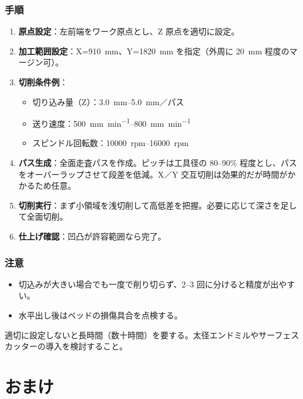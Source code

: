\documentclass[uplatex,dvipdfmx]{ujarticle}
\begin{document}
\subsubsection*{手順}
\begin{enumerate}
  \item \textbf{原点設定}：左前端をワーク原点とし、Z 原点を適切に設定。
  \item \textbf{加工範囲設定}：X=\SI{910}{\milli\meter}、Y=\SI{1820}{\milli\meter} を指定（外周に \SI{20}{\milli\meter} 程度のマージン可）。
  \item \textbf{切削条件例}：
  \begin{itemize}
    \item 切り込み量（Z）：\SIrange{3.0}{5.0}{\milli\meter}／パス
    \item 送り速度：\SIrange{500}{800}{\milli\meter\per\minute}
    \item スピンドル回転数：\SIrange{10000}{16000}{rpm}
  \end{itemize}
  \item \textbf{パス生成}：全面走査パスを作成。ピッチは工具径の 80--90\% 程度とし、パスをオーバーラップさせて段差を低減。X／Y 交互切削は効果的だが時間がかかるため任意。
  \item \textbf{切削実行}：まず小領域を浅切削して高低差を把握。必要に応じて深さを足して全面切削。
  \item \textbf{仕上げ確認}：凹凸が許容範囲なら完了。
\end{enumerate}

\subsubsection*{注意}
\begin{itemize}
  \item 切込みが大きい場合でも一度で削り切らず、2--3 回に分けると精度が出やすい。
  \item 水平出し後はベッドの損傷具合を点検する。
\end{itemize}

適切に設定しないと長時間（数十時間）を要する。太径エンドミルやサーフェスカッターの導入を検討すること。

\section{おまけ}
\end{document}
